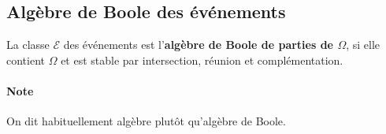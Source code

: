 \documentclass[10pt, french]{report}
\begin{document}
\begin{multicols*}{2}
\subsection{Algèbre de Boole des événements}
\begin{definitionNOHFILL}
La classe $\mathcal{E}$ des événements est l'\textbf{algèbre de Boole de parties de $\Omega$}, si elle contient $\Omega$ et est stable par intersection, réunion et complémentation.

\bigskip

\paragraph{Note}	On dit habituellement algèbre plutôt qu'algèbre de Boole.
\end{definitionNOHFILL}



\end{multicols*}
\end{document}
